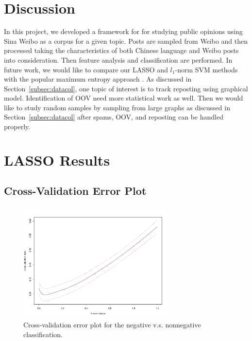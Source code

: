 \documentclass[11pt]{article}
\newcommand{\1}[1]{{\mathbf 1}\left\{#1\right\}}        %
\begin{document}
\section{Discussion}
In this project, we developed a framework for for studying public opinions using Sina Weibo as a corpus for a given topic. Posts are sampled from Weibo and then processed taking the characteristics of both Chinese language and Weibo posts into consideration. Then feature analysis and classification are performed. 
In future work, we would like to compare our LASSO and $l_1$-norm SVM methods with the popular maximum entropy approach \cite{lee2011chinese, nigam1999using}. As discussed in Section~\ref{subsec:datacol}, one topic of interest is to track reposting using graphical model. Identification of OOV need more statistical work as well. Then we would like to study random samples by sampling from large graphs as discussed in Section~\ref{subsec:datacol} after spams, OOV, and reposting can be handled properly.




\newpage




\newpage
\appendix

\section{LASSO Results}

\subsection{Cross-Validation Error Plot}\label{asec:cverror}

\begin{center}
\begin{figure}[!h]
   \centering
   \includegraphics[width=0.7\textwidth]{../lassoResults/CVNegErr.pdf} 
      \caption{Cross-validation error plot for the negative v.s. nonnegative classification. }
   \label{fig:cvplotneg}
\end{figure}
\end{center}
\end{document}
